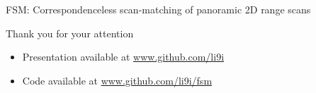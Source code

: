 \begin{frame}[noframenumbering]{FSM: Correspondenceless scan-matching of panoramic 2D range scans}

\begin{center}
  Thank you for your attention
\end{center}

  \vspace{2cm}

  \begin{itemize}
    \item \scriptsize Presentation available at \url{www.github.com/li9i}
    \item \scriptsize Code available at \url{www.github.com/li9i/fsm}
  \end{itemize}

\end{frame}
